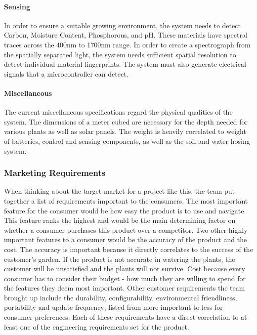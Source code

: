 \paragraph{Sensing}
In order to ensure a suitable growing environment, the system needs to detect Carbon, Moisture Content, Phosphorous, and pH. These materials have spectral traces across the 400nm to 1700nm range. In order to create a spectrograph from the spatially separated light, the system needs sufficient spatial resolution to detect individual material fingerprints. The system must also generate electrical signals that a microcontroller can detect.

\paragraph{Miscellaneous}
The current miscellaneous specifications regard the physical qualities of the system. The dimensions of a meter cubed are necessary for the depth needed for various plants as well as solar panels. The weight is heavily correlated to weight of batteries, control and sensing components, as well as the soil and water hosing system. 

\subsubsection{Marketing Requirements}
When thinking about the target market for a project like this, the team put together a list of requirements important to the consumers. The most important feature for the consumer would be how easy the product is to use and navigate. This feature ranks the highest and would be the main determining factor on whether a consumer purchases this product over a competitor. Two other highly important features to a consumer would be the accuracy of the product and the cost. The accuracy is important because it directly correlates to the success of the customer's garden. If the product is not accurate in watering the plants, the customer will be unsatisfied and the plants will not survive. Cost because every consumer has to consider their budget - how much they are willing to spend for the features they deem most important. Other customer requirements the team brought up include the durability, configurability, environmental friendliness, portability and update frequency; listed from more important to less for consumer preferences. Each of these requirements have a direct correlation to at least one of the engineering requirements set for the product. \\

